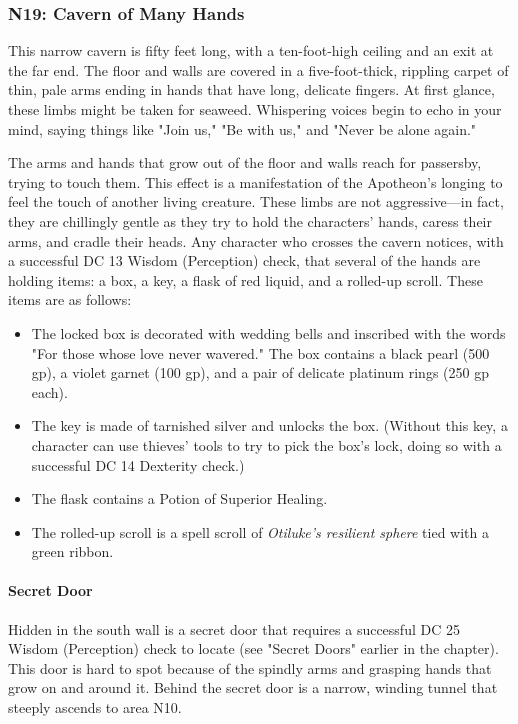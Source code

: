 \documentclass[10pt,a4,twoside,twocolumn,openany,nodeprecatedcode]{dndbook}
\begin{document}
\subsubsection{N19: Cavern of Many Hands}
\begin{DndReadAloud}{}
This narrow cavern is fifty feet long, with a ten-foot-high ceiling and an exit at the far end. The floor and walls are covered in a five-foot-thick, rippling carpet of thin, pale arms ending in hands that have long, delicate fingers. At first glance, these limbs might be taken for seaweed. Whispering voices begin to echo in your mind, saying things like "Join us," "Be with us," and "Never be alone again."
\end{DndReadAloud}

The arms and hands that grow out of the floor and walls reach for passersby, trying to touch them. This effect is a manifestation of the Apotheon's longing to feel the touch of another living creature. These limbs are not aggressive—in fact, they are chillingly gentle as they try to hold the characters' hands, caress their arms, and cradle their heads.
Any character who crosses the cavern notices, with a successful DC 13 Wisdom (Perception) check, that several of the hands are holding items: a box, a key, a flask of red liquid, and a rolled-up scroll. These items are as follows:
\begin{itemize}

\item The locked box is decorated with wedding bells and inscribed with the words "For those whose love never wavered." The box contains a black pearl (500 gp), a violet garnet (100 gp), and a pair of delicate platinum rings (250 gp each).
\item The key is made of tarnished silver and unlocks the box. (Without this key, a character can use thieves' tools to try to pick the box's lock, doing so with a successful DC 14 Dexterity check.)
\item The flask contains a Potion of Superior Healing.
\item The rolled-up scroll is a spell scroll of \textit{Otiluke's resilient sphere} tied with a green ribbon.
\end{itemize}


\paragraph{Secret Door}
Hidden in the south wall is a secret door that requires a successful DC 25 Wisdom (Perception) check to locate (see "Secret Doors" earlier in the chapter). This door is hard to spot because of the spindly arms and grasping hands that grow on and around it. Behind the secret door is a narrow, winding tunnel that steeply ascends to area N10.
\end{document}
